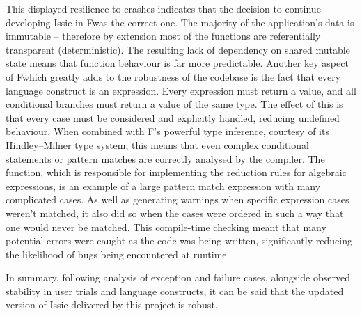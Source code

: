 This displayed resilience to crashes indicates that the decision to continue developing Issie in F\fsharp was the correct one. The majority of the application's data is immutable -- therefore by extension most of the functions are referentially transparent (deterministic). The resulting lack of dependency on shared mutable state means that function behaviour is far more predictable. Another key aspect of F\fsharp which greatly adds to the robustness of the codebase is the fact that every language construct is an expression. Every expression must return a value, and all conditional branches must return a value of the same type. The effect of this is that every case must be considered and explicitly handled, reducing undefined behaviour. When combined with F\fsharp's powerful type inference, courtesy of its Hindley–Milner type system, this means that even complex conditional statements or pattern matches are correctly analysed by the compiler. The  function, which is responsible for implementing the reduction rules for algebraic expressions, is an example of a large pattern match expression with many complicated cases. As well as generating warnings when specific expression cases weren't matched, it also did so when the cases were ordered in such a way that one would never be matched. This compile-time checking meant that many potential errors were caught as the code was being written, significantly reducing the likelihood of bugs being encountered at runtime.

In summary, following analysis of exception and failure cases, alongside observed stability in user trials and language constructs, it can be said that the updated version of Issie delivered by this project is robust.
